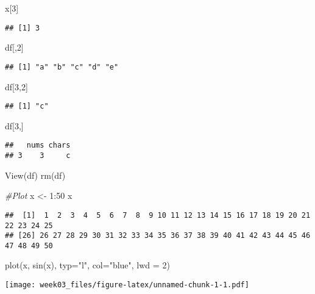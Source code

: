 \documentclass[
]{article}
\newenvironment{Shaded}{\begin{snugshade}}{\end{snugshade}}
\newcommand{\AttributeTok}[1]{\textcolor[rgb]{0.77,0.63,0.00}{#1}}
\newcommand{\CommentTok}[1]{\textcolor[rgb]{0.56,0.35,0.01}{\textit{#1}}}
\newcommand{\DecValTok}[1]{\textcolor[rgb]{0.00,0.00,0.81}{#1}}
\newcommand{\FunctionTok}[1]{\textcolor[rgb]{0.00,0.00,0.00}{#1}}
\newcommand{\NormalTok}[1]{#1}
\newcommand{\OtherTok}[1]{\textcolor[rgb]{0.56,0.35,0.01}{#1}}
\newcommand{\SpecialCharTok}[1]{\textcolor[rgb]{0.00,0.00,0.00}{#1}}
\newcommand{\StringTok}[1]{\textcolor[rgb]{0.31,0.60,0.02}{#1}}
\begin{document}
\begin{Shaded}
\begin{Highlighting}[]
\NormalTok{x[}\DecValTok{3}\NormalTok{]}
\end{Highlighting}
\end{Shaded}

\begin{verbatim}
## [1] 3
\end{verbatim}

\begin{Shaded}
\begin{Highlighting}[]
\NormalTok{df[,}\DecValTok{2}\NormalTok{]}
\end{Highlighting}
\end{Shaded}

\begin{verbatim}
## [1] "a" "b" "c" "d" "e"
\end{verbatim}

\begin{Shaded}
\begin{Highlighting}[]
\NormalTok{df[}\DecValTok{3}\NormalTok{,}\DecValTok{2}\NormalTok{]}
\end{Highlighting}
\end{Shaded}

\begin{verbatim}
## [1] "c"
\end{verbatim}

\begin{Shaded}
\begin{Highlighting}[]
\NormalTok{df[}\DecValTok{3}\NormalTok{,]}
\end{Highlighting}
\end{Shaded}

\begin{verbatim}
##   nums chars
## 3    3     c
\end{verbatim}

\begin{Shaded}
\begin{Highlighting}[]
\FunctionTok{View}\NormalTok{(df)}
\FunctionTok{rm}\NormalTok{(df)}

\CommentTok{\#Plot}
\NormalTok{x }\OtherTok{\textless{}{-}} \DecValTok{1}\SpecialCharTok{:}\DecValTok{50}
\NormalTok{x}
\end{Highlighting}
\end{Shaded}

\begin{verbatim}
##  [1]  1  2  3  4  5  6  7  8  9 10 11 12 13 14 15 16 17 18 19 20 21 22 23 24 25
## [26] 26 27 28 29 30 31 32 33 34 35 36 37 38 39 40 41 42 43 44 45 46 47 48 49 50
\end{verbatim}

\begin{Shaded}
\begin{Highlighting}[]
\FunctionTok{plot}\NormalTok{(x, }\FunctionTok{sin}\NormalTok{(x), }\AttributeTok{typ=}\StringTok{"l"}\NormalTok{, }\AttributeTok{col=}\StringTok{"blue"}\NormalTok{, }\AttributeTok{lwd =} \DecValTok{2}\NormalTok{)}
\end{Highlighting}
\end{Shaded}

\texttt{[image: week03\_files/figure-latex/unnamed-chunk-1-1.pdf]}
\end{document}
